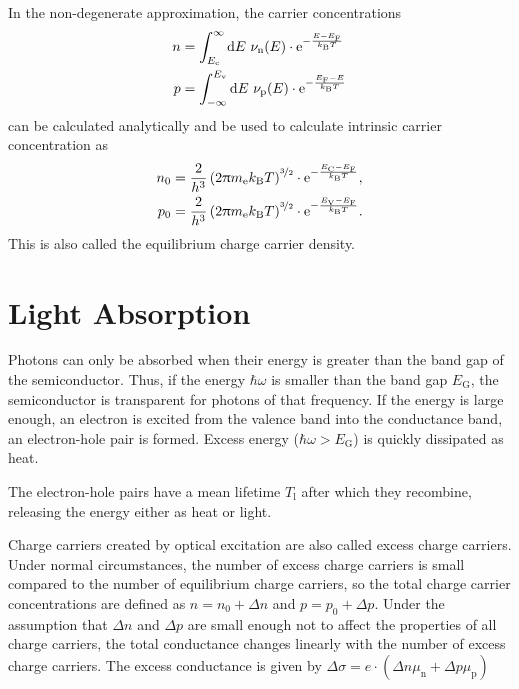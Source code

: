In the non-degenerate approximation, the carrier concentrations
\begin{align*}
	n &= \int_{E_\text{c}}^\infty\d E\ \nu_\text{n}(E)\cdot\e^{-\frac{E-E_\text{F}}{k_\text{B}T}} \\
	p &= \int_{-\infty}^{E_\text{v}}\d E\ \nu_\text{p}(E)\cdot\e^{-\frac{E_\text{F}-E}{k_\text{B}T}}
\end{align*}
can be calculated analytically and be used to calculate intrinsic carrier concentration as
\begin{alignat*}{1}
	n_0 &= \frac{2}{h^3}	\left(2 \uppi m_\text{e} k_\text{B} T \right)^{\nicefrac{3}{2}} \cdot	\mathrm{e}^{-\frac{E_\text{C} - E_\text{F}}{k_\text{B}T}},\\
	p_0 &= \frac{2}{h^3}	\left(2 \uppi m_\text{e} k_\text{B} T \right)^{\nicefrac{3}{2}} \cdot	\mathrm{e}^{-\frac{E_\text{V} - E_\text{F}}{k_\text{B}T}}.
\end{alignat*}
This is also called the equilibrium charge carrier density.

\section{Light Absorption}\label{sec:theory:absorption}
Photons can only be absorbed when their energy is greater than the band gap of the semiconductor.
Thus, if the energy $\hbar \omega$ is smaller than the band gap $E_\text{G}$, the semiconductor is transparent for photons of that frequency.
If the energy is large enough, an electron is excited from the valence band into the conductance band, an electron-hole pair is formed.
Excess energy ($\hbar \omega > E_\text{G}$) is quickly dissipated as heat.

The electron-hole pairs have a mean lifetime $T_\text{l}$ after which they recombine, releasing the energy either as heat or light.

Charge carriers created by optical excitation are also called excess charge carriers.
Under normal circumstances, the number of excess charge carriers is small compared to the number of equilibrium charge carriers, so the total charge carrier concentrations are defined as $n = n_0 + \Delta n$ and $p = p_0 + \Delta p$.
Under the assumption that $\Delta n$ and $\Delta p$ are small enough not to affect the properties of all charge carriers, the total conductance changes linearly with the number of excess charge carriers.
The excess conductance is given by $\Delta \sigma = e \cdot \left( \Delta n \mu_\text{n} + \Delta p \mu_\text{p} \right)$

